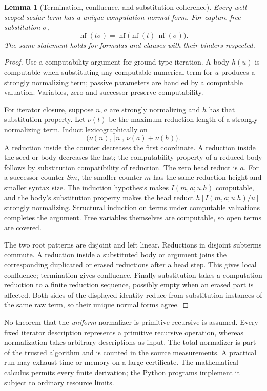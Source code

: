 \documentclass[11pt]{article}
\newtheorem{lemma}[theorem]{Lemma}
\theoremstyle{definition}
\theoremstyle{remark}
\DeclareMathOperator{\nf}{nf}
\begin{document}
\begin{lemma}[Termination, confluence, and substitution coherence]
Every well-scoped scalar term has a unique computation normal form.
For capture-free substitution $\sigma$,
\[
 \nf(t\sigma)=\nf\bigl(\nf(t)\,\nf(\sigma)\bigr).
\]
The same statement holds for formulas and clauses with their binders respected.
\end{lemma}
\begin{proof}
Use a computability argument for ground-type iteration.
A body $h(u)$ is computable when substituting any computable numerical
term for $u$ produces a strongly normalizing term; passive parameters
are handled by a computable valuation. Variables, zero and successor
preserve computability.

For iterator closure, suppose $n,a$ are strongly normalizing and
$h$ has that substitution property. Let $\nu(t)$ be the maximum
reduction length of a strongly normalizing term. Induct lexicographically on
\[
 \bigl(\nu(n),\,|n|,\,\nu(a)+\nu(h)\bigr).
\]
A reduction inside the counter decreases the first coordinate.
A reduction inside the seed or body decreases the last; the computability
property of a reduced body follows by substitution compatibility of reduction.
The zero head reduct is $a$. For a successor counter $Sm$, the smaller
counter $m$ has the same reduction height and smaller syntax size.
The induction hypothesis makes $I(m,a;u.h)$ computable, and the body's
substitution property makes the head reduct
$h[I(m,a;u.h)/u]$ strongly normalizing.
Structural induction on terms under computable valuations completes the
argument. Free variables themselves are computable, so open terms are covered.

The two root patterns are disjoint and left linear. Reductions in disjoint
subterms commute. A reduction inside a substituted body or argument joins
the corresponding duplicated or erased reductions after a head step.
This gives local confluence; termination gives confluence.
Finally substitution takes a computation reduction to a finite reduction
sequence, possibly empty when an erased part is affected. Both sides of the
displayed identity reduce from substitution instances of the same raw term,
so their unique normal forms agree.
\end{proof}

No theorem that the \emph{uniform} normalizer is primitive recursive is
assumed. Every fixed iterator description represents a primitive recursive
operation, whereas normalization takes arbitrary descriptions as input.
The total normalizer is part of the trusted algorithm and is counted in the
source measurements. A practical run may exhaust time or memory on a large
certificate. The mathematical calculus permits every finite derivation;
the Python programs implement it subject to ordinary resource limits.
\end{document}
